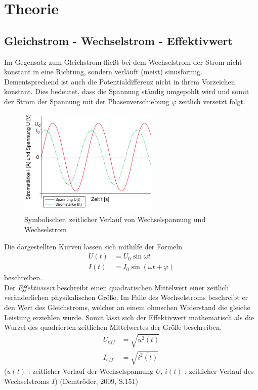 \section{Theorie}	
%
\subsection{Gleichstrom - Wechselstrom - Effektivwert}
%
Im Gegensatz zum Gleichstrom fließt bei dem Wechselstrom der Strom nicht konstant in eine Richtung, sondern verläuft (meist) sinusförmig. Dementsprechend ist auch die Potentialdifferenz nicht in ihrem Vorzeichen konstant. Dies bedeutet, dass die Spannung ständig umgepohlt wird und somit der Strom der Spannung mit der Phasenverschiebung $\varphi$ zeitlich versetzt folgt.
%
\begin{figure}[H]
	\begin{center}
		\includegraphics[width=18em]{wechselstrom}
	\end{center}
	\caption{Symbolischer, zeitlicher Verlauf von Wechselspannung und Wechselstrom}
\end{figure}
%
Die dargestellten Kurven lassen sich mithilfe der Formeln
%
\begin{align}
	U(t) &= U_0 \sin \omega t\\
	I(t) &= I_0 \sin(\omega t + \varphi)
\end{align}
%
beschreiben.\\
Der \textit{Effektivwert} beschreibt einen quadratischen Mittelwert einer zeitlich veränderlichen physikalischen Größe. Im Falle des Wechselstroms beschreibt er den Wert des Gleichstroms, welcher an einem ohmschen Widerstand die gleiche Leistung erziehlen würde. Somit lässt sich der Effektivwert mathematisch als die Wurzel des quadrierten zeitlichen Mittelwertes der Größe beschreiben.
%
\begin{align}
	U_{eff} &= \sqrt{\overline{u^2(t)}}\\
	I_{eff} &= \sqrt{\overline{i^2(t)}}
\end{align}
%
($u(t)$ : zeitlicher Verlauf der Wechselspannung $U$, $i(t)$ : zeitlicher Verlauf des Wechselstroms $I$) (Demtröder, 2009, S.151)
%
